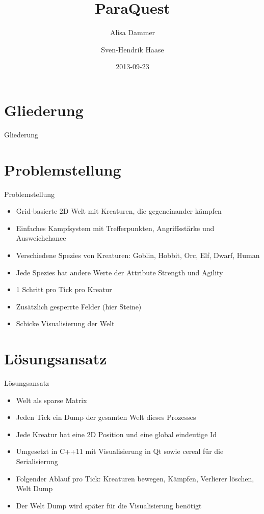 \documentclass{beamer}
\begin{document}
\title{ParaQuest}
\date{2013-09-23}
\author{Alisa Dammer \and Sven-Hendrik Haase}

\begin{frame}
    \titlepage
\end{frame}

\section*{Gliederung}
\begin{frame}{Gliederung}
    \tableofcontents
\end{frame}

\section{Problemstellung}
\begin{frame}{Problemstellung}
\begin{itemize}
    \item Grid-basierte 2D Welt mit Kreaturen, die gegeneinander kämpfen
    \item Einfaches Kampfsystem mit Trefferpunkten, Angriffsstärke und Ausweichchance
    \item Verschiedene Spezies von Kreaturen: Goblin, Hobbit, Orc, Elf, Dwarf, Human
    \item Jede Spezies hat andere Werte der Attribute Strength und Agility
    \item 1 Schritt pro Tick pro Kreatur
    \item Zusätzlich gesperrte Felder (hier Steine)
    \item Schicke Visualisierung der Welt
\end{itemize}
\end{frame}


\section{Lösungsansatz}
\begin{frame}{Lösungsansatz}
\begin{itemize}
    \item Welt als sparse Matrix
    \item Jeden Tick ein Dump der gesamten Welt dieses Prozesses
    \item Jede Kreatur hat eine 2D Position und eine global eindeutige Id
    \item Umgesetzt in C++11 mit Visualisierung in Qt sowie cereal für die Serialisierung
    \item Folgender Ablauf pro Tick: Kreaturen bewegen, Kämpfen, Verlierer löschen, Welt Dump
    \item Der Welt Dump wird später für die Visualisierung benötigt
\end{itemize}
\end{frame}
\end{document}
